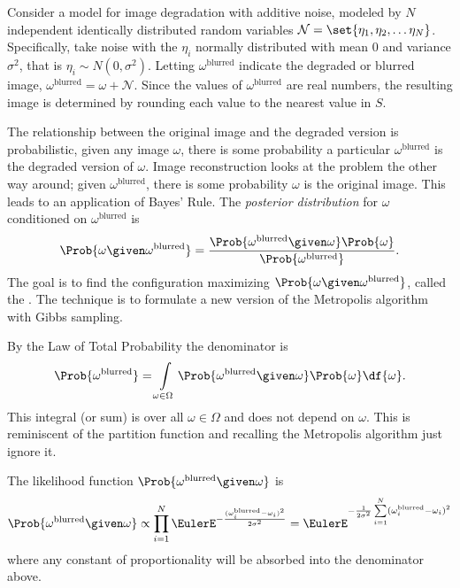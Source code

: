 \documentclass[12pt]{article}
\begin{document}
Consider a model for image degradation with additive noise, modeled by \(
N \) independent identically distributed random variables \( \mathcal{N}
= \set{\eta_1, \eta_2, \dots \eta_N} \).  Specifically, take noise with
the \( \eta_i \) normally distributed with mean \( 0 \) and variance \(
\sigma^2 \), that is \( \eta_i \sim N(0, \sigma^2) \). Letting \( \omega^
{\text{blurred}} \) indicate the degraded or blurred image, \( \omega^{\text
{blurred}} = \omega + \mathcal{N} \).  Since the values of \( \omega^{\text
{blurred}} \) are real numbers, the resulting image is determined by
rounding each value to the nearest value in \( S \).

The relationship between the original image and the degraded version is
probabilistic, given any image \( \omega \), there is some probability a
particular \( \omega^{\text{blurred}} \) is the degraded version of \(
\omega \).  Image reconstruction looks at the problem the other way
around; given \( \omega^{\text{blurred}} \), there is some probability \(
\omega \) is the original image.  This leads to an application of Bayes'
Rule.  The \emph{posterior distribution}%
for \( \omega \) conditioned on \( \omega^{\text{blurred}} \) is
\[
    \Prob{\omega \given \omega^{\text{blurred}}} = \frac{\Prob{\omega^{\text
    {blurred}} \given \omega} \Prob{\omega}} {\Prob{\omega^{\text{blurred}}}}.
\] The goal is to find the configuration maximizing \( \Prob{\omega
\given \omega^{\text{blurred}}} \), called the .%
The technique is to formulate a new version of the Metropolis algorithm
with Gibbs sampling.

By the Law of Total Probability the denominator is
\[
    \Prob{ \omega^{\text{blurred}}} = \int\limits_{\omega \in \Omega}
    \Prob{\omega^{\text{blurred}} \given \omega} \Prob{\omega} \df{\omega}.
\] This integral (or sum) is over all \( \omega \in \Omega \) and does
not depend on \( \omega \).  This is reminiscent of the partition
function and recalling the Metropolis algorithm just ignore it.

The likelihood function \( \Prob{\omega^{\text{blurred}} \given \omega} \)
is%
\[
    \Prob{\omega^{\text{blurred}} \given \omega} \propto \prod_{i=1}^N
    \EulerE^{-\frac{ (\omega_i^{\text{blurred}} - \omega_i)^2}{2 \sigma^2}}
    = \EulerE^{ -\frac{1}{2\sigma^2} \sum\limits_{i=1}^N (\omega_i^{\text
    {blurred}} - \omega_i)^2}
\] where any constant of proportionality will be absorbed into the
denominator above.
\end{document}
